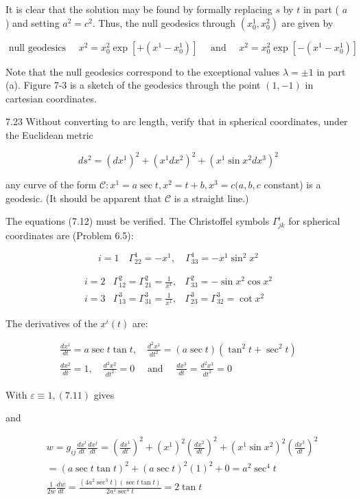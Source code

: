 \documentclass[10pt]{article}
\begin{document}
It is clear that the solution may be found by formally replacing $s$ by $t$ in part ( $a$ ) and setting $a^{2}=c^{2}$. Thus, the null geodesics through $\left(x_{0}^{1}, x_{0}^{2}\right)$ are given by

$$
\text { null geodesics } \quad x^{2}=x_{0}^{2} \exp \left[+\left(x^{1}-x_{0}^{1}\right)\right] \quad \text { and } \quad x^{2}=x_{0}^{2} \exp \left[-\left(x^{1}-x_{0}^{1}\right)\right]
$$

Note that the null geodesics correspond to the exceptional values $\lambda= \pm 1$ in part (a). Figure 7-3 is a sketch of the geodesics through the point $(1,-1)$ in cartesian coordinates.

7.23 Without converting to arc length, verify that in spherical coordinates, under the Euclidean metric

$$
d s^{2}=\left(d x^{1}\right)^{2}+\left(x^{1} d x^{2}\right)^{2}+\left(x^{1} \sin x^{2} d x^{3}\right)^{2}
$$

any curve of the form $\mathscr{C}: x^{1}=a \sec t, x^{2}=t+b, x^{3}=c(a, b, c$ constant) is a geodesic. (It should be apparent that $\mathscr{C}$ is a straight line.)

The equations (7.12) must be verified. The Christoffel symbols $\Gamma_{j k}^{i}$ for spherical coordinates are (Problem 6.5):

$$
i=1 \quad \Gamma_{22}^{1}=-x^{1}, \quad \Gamma_{33}^{1}=-x^{1} \sin ^{2} x^{2}
$$

$$
\begin{array}{lll}
i=2 & \Gamma_{12}^{2}=\Gamma_{21}^{2}=\frac{1}{x^{1}}, & \Gamma_{33}^{2}=-\sin x^{2} \cos x^{2} \\
i=3 & \Gamma_{13}^{3}=\Gamma_{31}^{3}=\frac{1}{x^{1}}, & \Gamma_{23}^{3}=\Gamma_{32}^{3}=\cot x^{2}
\end{array}
$$

The derivatives of the $x^{i}(t)$ are:

$$
\begin{gathered}
\frac{d x^{1}}{d t}=a \sec t \tan t, \quad \frac{d^{2} x^{1}}{d t^{2}}=(a \sec t)\left(\tan ^{2} t+\sec ^{2} t\right) \\
\frac{d x^{2}}{d t}=1, \quad \frac{d^{2} x^{2}}{d t^{2}}=0 \quad \text { and } \quad \frac{d x^{3}}{d t}=\frac{d^{2} x^{3}}{d t^{2}}=0
\end{gathered}
$$

With $\varepsilon \equiv 1,(7.11)$ gives

and

$$
\begin{aligned}
& w=g_{i j} \frac{d x^{i}}{d t} \frac{d x^{j}}{d t}=\left(\frac{d x^{1}}{d t}\right)^{2}+\left(x^{1}\right)^{2}\left(\frac{d x^{2}}{d t}\right)^{2}+\left(x^{1} \sin x^{2}\right)^{2}\left(\frac{d x^{3}}{d t}\right)^{2} \\
&=(a \sec t \tan t)^{2}+(a \sec t)^{2}(1)^{2}+0=a^{2} \sec ^{4} t \\
& \frac{1}{2 w} \frac{d w}{d t}=\frac{\left(4 a^{2} \sec ^{3} t\right)(\sec t \tan t)}{2 a^{2} \sec ^{4} t}=2 \tan t
\end{aligned}
$$
\end{document}
